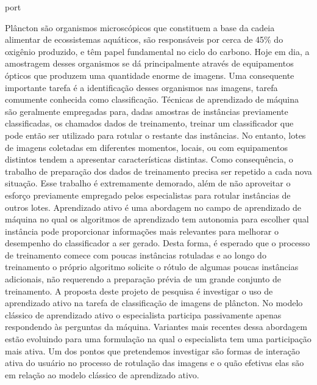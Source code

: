 \begin{resumo}{port}

Plâncton são organismos microscópicos que constituem a base da cadeia alimentar de ecossistemas aquáticos, são responsáveis por cerca de 45\% do oxigênio produzido, e têm papel fundamental no ciclo do carbono. Hoje em dia, a amostragem desses organismos se dá principalmente através de equipamentos ópticos que produzem uma quantidade enorme de imagens. Uma consequente importante tarefa é a identificação desses organismos nas imagens, tarefa comumente conhecida como classificação. Técnicas de aprendizado de máquina são geralmente empregadas para, dadas amostras de instâncias previamente classificadas, os chamados dados de treinamento, treinar um classificador que pode então ser utilizado para rotular o restante das instâncias. No entanto, lotes de imagens coletadas em diferentes momentos, locais, ou com equipamentos distintos tendem a apresentar características distintas. Como consequência, o trabalho de preparação dos dados de treinamento precisa ser repetido a cada nova situação. Esse trabalho é extremamente demorado, além de não aproveitar o esforço previamente empregado pelos especialistas para rotular instâncias de outros lotes. Aprendizado ativo é uma abordagem no campo de aprendizado de máquina no qual os algoritmos de aprendizado tem autonomia para escolher qual instância pode proporcionar informações mais relevantes para melhorar o desempenho do classificador a ser gerado. Desta forma, é esperado que o processo de treinamento comece com poucas instâncias rotuladas e ao longo do treinamento o próprio algoritmo solicite o rótulo de algumas poucas instâncias adicionais, não requerendo a preparação prévia de um grande conjunto de treinamento. A proposta deste projeto de pesquisa é investigar o uso de aprendizado ativo na tarefa de classificação de imagens de plâncton. No modelo clássico de aprendizado ativo o especialista participa passivamente apenas respondendo às perguntas da máquina. Variantes mais recentes dessa abordagem estão evoluindo para uma formulação na qual o especialista tem uma participação mais ativa. Um dos pontos que pretendemos investigar são formas de interação ativa do usuário no processo de rotulação das imagens e o quão efetivas elas são em relação ao modelo clássico de aprendizado ativo.

\end{resumo}




